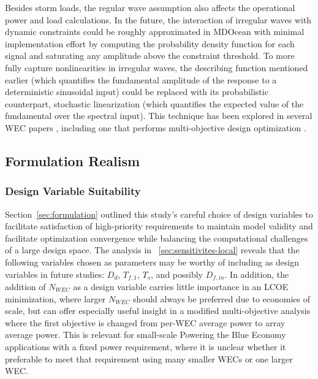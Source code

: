 Besides storm loads, the regular wave assumption also affects the operational power and load calculations.
In the future, the interaction of irregular waves with dynamic constraints could be roughly approximated in MDOcean with minimal implementation effort by computing the probability density function for each signal and saturating any amplitude above the constraint threshold.
To more fully capture nonlinearities in irregular waves, the describing function mentioned earlier (which quantifies the fundamental amplitude of the response to a deterministic sinusoidal input) could be replaced with its probabilistic counterpart, stochastic linearization (which quantifies the expected value of the fundamental over the spectral input).
This technique has been explored in several WEC papers \cite{da_silva_statistical_2020,da_silva_stochastic_2023,kluger_synergistic_2017,folley_spectral-domain_2016,spanos_efficient_2016}, including one that performs multi-objective design optimization \cite{neshat_enhancing_2024}.


\subsection{Formulation Realism}
\subsubsection{Design Variable Suitability}
Section~\ref{sec:formulation} outlined this study's careful choice of design variables to facilitate satisfaction of high-priority requirements to maintain model validity and facilitate optimization convergence while balancing the computational challenges of a large design space.
The analysis in \sectionautorefname~\ref{sec:sensitivites-local} reveals that the following variables chosen as parameters may be worthy of including as design variables in future studies: $D_d$, $T_{f,1}$, $T_s$, and possibly $D_{f,in}$.
In addition, the addition of $N_{WEC}$ as a design variable carries little importance in an LCOE minimization, where larger $N_{WEC}$ should always be preferred due to economies of scale, but can offer especially useful insight in a modified multi-objective analysis where the first objective is changed from per-WEC average power to array average power.
This is relevant for small-scale Powering the Blue Economy applications with a fixed power requirement, where it is unclear whether it preferable to meet that requirement using many smaller WECs or one larger WEC.

